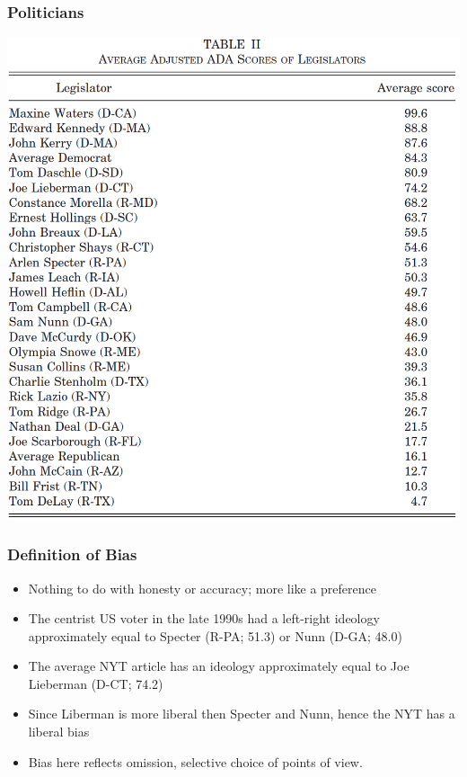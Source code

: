 \documentclass[english]{beamer}
\begin{document}
\begin{frame}
\frametitle{Politicians}
\vspace{-10pt}
\begin{center}
\includegraphics[scale=0.39]{Images/groseclose_milyio_table4}
\end{center}
\end{frame}


\begin{frame}

\frametitle{Definition of Bias}

\begin{itemize}
\item{Nothing to do with honesty or accuracy; more like a preference}
\vspace*{7pt}
\item{The centrist US voter in the late 1990s had a left-right ideology approximately equal to Specter (R-PA; 51.3) or Nunn (D-GA; 48.0)}
\vspace*{7pt}
\item{The average NYT article has an ideology approximately equal to Joe Lieberman (D-CT; 74.2)}
\vspace*{7pt}
\item{Since Liberman is more liberal then Specter and Nunn, hence the NYT has a liberal bias}
\vspace*{7pt}
\item{Bias here reflects omission, selective choice of points of view.}
\end{itemize}
\end{frame}
\end{document}
